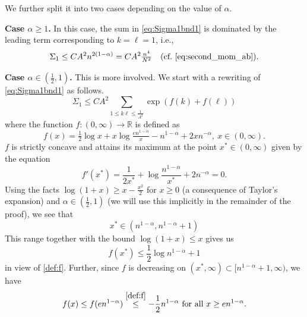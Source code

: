 \documentclass[11pt,reqno,letterpaper]{amsart}
\numberwithin{equation}{section}
\theoremstyle{plain}
\def \R{\mathbb{R}}
\begin{document}
We further split it into two cases depending on the value of $\alpha$.

\smallskip

{\bf Case $\alpha \ge 1$.} In this case, the sum in \eqref{eq:Sigma1bnd1} is 
dominated by the leading term corresponding to $k = \ell = 1$, i.e., 
\begin{equation}\label{eq:Sigma1bnd2_1}
 \Sigma_1 \le C A^2 n^{2(1 - \alpha)} = C A^2 \tfrac{n^4}{N^2} \quad \mbox{(cf.~\eqref{eq:second_mom_ab}).}
\end{equation}

\smallskip

{\bf Case $\alpha \in (\frac 12, 1)$.} This is more involved. We start with a 
rewriting of \eqref{eq:Sigma1bnd1} as follows.
\begin{equation}\label{eq:Sigma1bnd2_2}
\Sigma_1 \le CA^2 \sum_{1 \le k\ell \le \frac1{A^2}} \exp(f(k) + f(\ell))
\end{equation}
where the function $f: (0, \infty) \to \R$ is defined as 
\begin{equation}\label{def:f}
f(x) = \tfrac12\log x + x\log \tfrac{en^{1 - \alpha}}{x} - n^{1 - \alpha} + 2xn^{-\alpha}, \: x \in (0, \infty).
\end{equation}
$f$ is strictly concave and attains its maximum at the point $x^\ast \in (0, \infty)$ given by the equation
\begin{equation*}
f'(x^\ast) = \frac 1 {2x^\ast} + \log \frac{n^{1 - \alpha}}{x^\ast} + 2n^{-\alpha} = 0.
\end{equation*}
Using the facts $\log (1 + x) \ge x - \frac{x^2}{2}$ for $x \ge 0$ (a consequence of 
Taylor's expansion) and $\alpha \in (\frac12, 1)$ (we will use this implicitly in the remainder of the proof), we see that 
\begin{equation}\label{eq:rangex_ast}
x^\ast \in (n^{1-\alpha}, n^{1-\alpha} + 1)    
\end{equation}
This range together with the bound $\log(1 + x) \le x$ gives us
\begin{equation}\label{eq:fxast}
f(x^\ast) \le \frac12\log n^{1 - \alpha} + 1
\end{equation}
in view of \eqref{def:f}. Further, since $f$ is decreasing on 
$(x^\ast, \infty) \subset [n^{1 - \alpha} + 1, \infty)$, %
we have
\begin{equation}\label{eq:fxbnd}
f(x) \le f(e n^{1 - \alpha}) \stackrel{\eqref{def:f}}{\le} -\frac12 n^{1 - \alpha} \mbox{ for all } x \ge en^{1 - \alpha}.
\end{equation}
\end{document}
